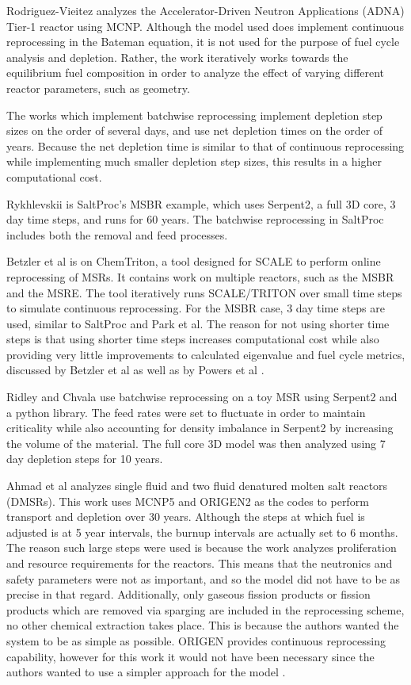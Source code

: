 Rodriguez-Vieitez \cite{rodriguez-vieitez_transmutation_2002} analyzes the Accelerator-Driven Neutron Applications (ADNA) Tier-1 reactor using MCNP. Although the model used does implement continuous reprocessing in the Bateman equation, it is not used for the purpose of fuel cycle analysis and depletion. Rather, the work iteratively works towards the equilibrium fuel composition in order to analyze the effect of varying different reactor parameters, such as geometry.

The works which implement batchwise reprocessing implement depletion step sizes on the order of several days, and use net depletion times on the order of years. Because the net depletion time is similar to that of continuous reprocessing while implementing much smaller depletion step sizes, this results in a higher computational cost.


Rykhlevskii \cite{rykhlevskii_modeling_2019} is SaltProc's MSBR example, which uses Serpent2, a full 3D core, 3 day time steps, and runs for 60 years. The batchwise reprocessing in SaltProc includes both the removal and feed processes.

Betzler et al \cite{betzler_molten_2017} is on ChemTriton, a tool designed for SCALE to perform online reprocessing of MSRs. It contains work on multiple reactors, such as the MSBR and the MSRE. The tool iteratively runs SCALE/TRITON over small time steps to simulate continuous reprocessing. For the MSBR case, 3 day time steps are used, similar to SaltProc and Park et al. The reason for not using shorter time steps is that using shorter time steps increases computational cost while also providing very little improvements to calculated eigenvalue and fuel cycle metrics, discussed by Betzler et al as well as by Powers et al \cite{powers_new_2013}.

Ridley and Chvala \cite{ridley_method_2017} use batchwise reprocessing on a toy MSR using Serpent2 and a python library. The feed rates were set to fluctuate in order to maintain criticality while also accounting for density imbalance in Serpent2 by increasing the volume of the material. The full core 3D model was then analyzed using 7 day depletion steps for 10 years.

Ahmad et al \cite{ahmad_neutronics_2015} analyzes single fluid and two fluid denatured molten salt reactors (DMSRs). This work uses MCNP5 and ORIGEN2 as the codes to perform transport and depletion over 30 years. Although the steps at which fuel is adjusted is at 5 year intervals, the burnup intervals are actually set to 6 months. The reason such large steps were used is because the work analyzes proliferation and resource requirements for the reactors. This means that the neutronics and safety parameters were not as important, and so the model did not have to be as precise in that regard. Additionally, only gaseous fission products or fission products which are removed via sparging are included in the reprocessing scheme, no other chemical extraction takes place. This is because the authors wanted the system to be as simple as possible. ORIGEN provides continuous reprocessing capability, however for this work it would not have been necessary since the authors wanted to use a simpler approach for the model \cite{gauld_isotopic_2011}.

